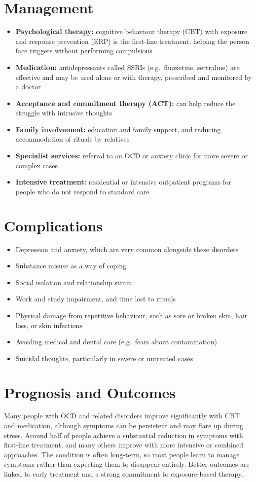 \section*{Management}
\begin{itemize}
    \item \textbf{Psychological therapy:} cognitive behaviour therapy (CBT) with exposure and response prevention (ERP) is the first-line treatment, helping the person face triggers without performing compulsions
    \item \textbf{Medication:} antidepressants called SSRIs (e.g.\ fluoxetine, sertraline) are effective and may be used alone or with therapy, prescribed and monitored by a doctor
    \item \textbf{Acceptance and commitment therapy (ACT):} can help reduce the struggle with intrusive thoughts
    \item \textbf{Family involvement:} education and family support, and reducing accommodation of rituals by relatives
    \item \textbf{Specialist services:} referral to an OCD or anxiety clinic for more severe or complex cases
    \item \textbf{Intensive treatment:} residential or intensive outpatient programs for people who do not respond to standard care
\end{itemize}

\section*{Complications}
\begin{itemize}
    \item Depression and anxiety, which are very common alongside these disorders
    \item Substance misuse as a way of coping
    \item Social isolation and relationship strain
    \item Work and study impairment, and time lost to rituals
    \item Physical damage from repetitive behaviour, such as sore or broken skin, hair loss, or skin infections
    \item Avoiding medical and dental care (e.g.\ fears about contamination)
    \item Suicidal thoughts, particularly in severe or untreated cases
\end{itemize}

\section*{Prognosis and Outcomes}
Many people with OCD and related disorders improve significantly with CBT and medication, although symptoms can be persistent and may flare up during stress. Around half of people achieve a substantial reduction in symptoms with first-line treatment, and many others improve with more intensive or combined approaches. The condition is often long-term, so most people learn to manage symptoms rather than expecting them to disappear entirely. Better outcomes are linked to early treatment and a strong commitment to exposure-based therapy.

